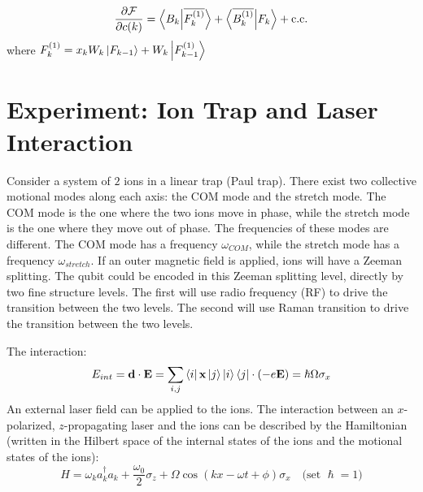 \documentclass{simple-notes}
\newcommand{\dvbar}[1]{\overline{#1}}
\begin{document}
\begin{align*}
    \pdv{\mathcal{F}}{c(k)} = \braket{B_k}{\dvbar{F_k^{(1)}}} + \braket{\dvbar{B_k^{(1)}}}{F_k} + \text{c.c.}
\end{align*}
where $F_k^{(1)} = x_k W_k\ket{F_{k-1}} + W_k\ket{F_{k-1}^{(1)}}$
\section{Experiment: Ion Trap and Laser Interaction}
Consider a system of $2$ ions in a linear trap (Paul trap). There exist two collective motional modes along each axis: the COM mode and the stretch mode. The COM mode is the one where the two ions move in phase, while the stretch mode is the one where they move out of phase. The frequencies of these modes are different. The COM mode has a frequency $\omega_{COM}$, while the stretch mode has a frequency $\omega_{stretch}$. 
If an outer magnetic field is applied, ions will have a Zeeman splitting. The qubit could be encoded in this Zeeman splitting level, directly by two fine structure levels. The first will use radio frequency (RF) to drive the transition between the two levels. The second will use Raman transition to drive the transition between the two levels.

The interaction:
\begin{equation}
    E_{int} = \vb d \cdot \vb E = \sum_{i,j} \bra{i} \vb x \ket{j} \ket{i}\bra{j} \cdot (-e\vb E) = \hslash\Omega\sigma_x 
\end{equation}
An external laser field can be applied to the ions. The interaction between an $x$-polarized, $z$-propagating laser and the ions can be described by the Hamiltonian (written in the Hilbert space of the internal states of the ions and the motional states of the ions):
\begin{equation}
H =  \omega_k a_k^\dagger a_k +  \frac{\omega_0}{2} \sigma_z +  {\Omega} \cos(k x - \omega t + \phi)\sigma_x \quad \text{(set $\hslash = 1$)}
\end{equation}
\end{document}
